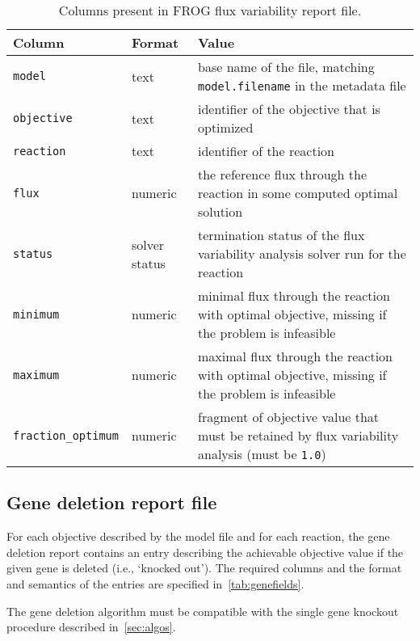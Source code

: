

\begin{table}\tablefont
\begin{tabular}{llp{30em}}
\toprule
Column & Format & Value \\
\midrule
\verb|model|
 & text
 & base name of the file, matching \verb|model.filename| in the metadata file
 \\
\verb|objective|
 & text
 & identifier of the objective that is optimized
 \\
\verb|reaction|
 & text
 & identifier of the reaction
 \\
\verb|flux|
 & numeric
 & the reference flux through the reaction in some computed optimal solution
 \\
\verb|status|
 & solver status
 & termination status of the flux variability analysis solver run for the reaction
 \\
\verb|minimum|
 & numeric
 & minimal flux through the reaction with optimal objective, missing if the problem is infeasible
 \\
\verb|maximum|
 & numeric
 & maximal flux through the reaction with optimal objective, missing if the problem is infeasible
 \\
\verb|fraction_optimum|
 & numeric
 & fragment of objective value that must be retained by flux variability analysis (must be \verb|1.0|)
 \\
\bottomrule
\end{tabular}
\caption{Columns present in FROG flux variability report file.}
\label{tab:fvafields}
\end{table}

\subsection{Gene deletion report file}
\label{sec:genes}

For each objective described by the model file and for each reaction, the gene deletion report contains an entry describing the achievable objective value if the given gene is deleted (i.e., `knocked out'). The required columns and the format and semantics of the entries are specified in~\cref{tab:genefields}.

The gene deletion algorithm must be compatible with the single gene knockout procedure described in~\cref{sec:algos}.

